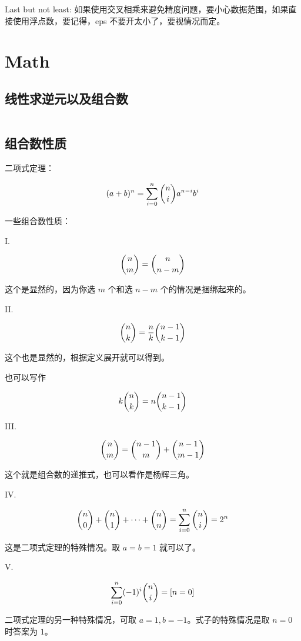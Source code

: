 \documentclass[titlepage, a4paper]{article}
\begin{document}
\begin{multicols}{2}
\begin{spacing}{0.6}
			 		Last but not least: 如果使用交叉相乘来避免精度问题，要小心数据范围，如果直接使用浮点数，要记得，eps 不要开太小了，要视情况而定。
			 		
			 \section{Math}
			 	\subsection{线性求逆元以及组合数}
			 		\inputminted{cpp}{src/Math/Comb_inv.cpp}
			 	\subsection{组合数性质}
			 		二项式定理：
			 	
				 	$$
				 	(a + b)^n = \sum\limits_{i = 0}^{n}\dbinom{n}{i}a^{n - i}b^{i}
				 	$$
				 	
				 	一些组合数性质：
				 	
				 	I. 
				 	
				 	$$
				 	\dbinom{n}{m}=\dbinom{n}{n-m}
				 	$$
				 	
				 	这个是显然的，因为你选 $m$ 个和选 $n - m$ 个的情况是捆绑起来的。
				 	
				 	II.
				 	
				 	$$
				 	\dbinom{n}{k} = \dfrac{n}{k} \dbinom{n-1}{k-1}
				 	$$
				 	
				 	这个也是显然的，根据定义展开就可以得到。
				 	
				 	也可以写作
				 	
				 	$$
				 	k\dbinom{n}{k} = n\dbinom{n - 1}{k - 1}
				 	$$
				 	
				 	III.
				 	
				 	$$
				 	\dbinom{n}{m}=\dbinom{n-1}{m}+\dbinom{n-1}{m-1}
				 	$$
				 	
				 	这个就是组合数的递推式，也可以看作是杨辉三角。
				 	
				 	IV. 
				 	
				 	$$
				 	\dbinom{n}{0}+\dbinom{n}{1}+\cdots+\dbinom{n}{n}=\sum_{i=0}^n\dbinom{n}{i}=2^n
				 	$$
				 	
				 	这是二项式定理的特殊情况。取 $a=b=1$ 就可以了。
				 	
				 	
				 	V.
				 	
				 	$$
				 	\sum_{i=0}^n(-1)^i\dbinom{n}{i}=[n=0]
				 	$$
				 	
				 	二项式定理的另一种特殊情况，可取 $a=1, b=-1$。式子的特殊情况是取 $n=0$ 时答案为 $1$。
				 	

\end{spacing}
\end{multicols}
\end{document}
